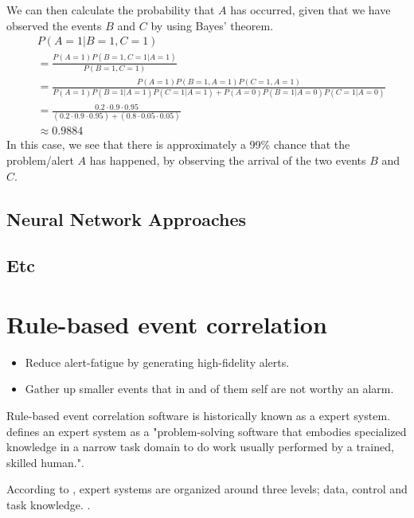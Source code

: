 We can then calculate the probability that $A$ has occurred, given that we have observed the events $B$ and $C$ by using Bayes' theorem.
\begin{align*}
    &P(A=1 | B=1, C=1)\\
    &=\frac{P(A=1)P(B=1,C=1|A=1)}{P(B=1,C=1)}\\
    &=\frac{P(A=1)P(B=1,A=1)P(C=1,A=1)}{P(A=1)P(B=1|A=1)P(C=1|A=1)+P(A=0)P(B=1|A=0)P(C=1|A=0)}\\
    &=\frac{0.2\cdot0.9\cdot0.95}{(0.2\cdot0.9\cdot0.95)+(0.8\cdot0.05\cdot0.05)}\\
    &\approx 0.9884
\end{align*}
In this case, we see that there is approximately a 99\% chance that the problem/alert $A$ has happened, by observing the arrival of the two events $B$ and $C$.


\subsection{Neural Network Approaches}
\subsection{Etc}



\section{Rule-based event correlation}
\label{sec:eventcorrelation}

\begin{itemize}
    \item Reduce alert-fatigue by generating high-fidelity alerts.
    \item Gather up smaller events that in and of them self are not worthy an alarm.
\end{itemize}

Rule-based event correlation software is historically known as a expert system. \cite{cronk_1988} defines an expert system as a "problem-solving software that embodies specialized knowledge in a narrow task domain to do work usually performed by a trained, skilled human.".

According to \cite{cronk_1988}, expert systems are organized around three levels; data, control and task knowledge. .

